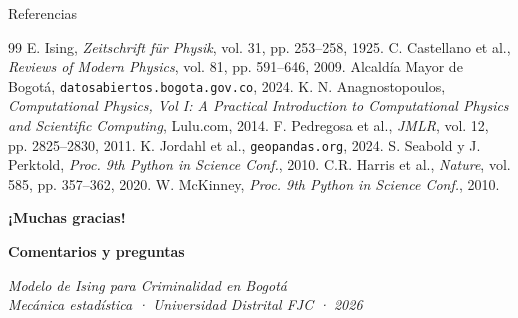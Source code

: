 \documentclass[11pt]{beamer}
\begin{document}
\begin{frame}{Referencias}

\footnotesize
\begin{thebibliography}{99}
 E. Ising, \textit{Zeitschrift für Physik}, vol. 31, pp. 253--258, 1925.
 C. Castellano et al., \textit{Reviews of Modern Physics}, vol. 81, pp. 591--646, 2009.
 Alcaldía Mayor de Bogotá, \texttt{datosabiertos.bogota.gov.co}, 2024.
K. N. Anagnostopoulos, \textit{Computational Physics, Vol I: A Practical Introduction to Computational Physics and Scientific Computing}, Lulu.com, 2014.
 F. Pedregosa et al., \textit{JMLR}, vol. 12, pp. 2825--2830, 2011.
 K. Jordahl et al., \texttt{geopandas.org}, 2024.
 S. Seabold y J. Perktold, \textit{Proc. 9th Python in Science Conf.}, 2010.
 C.R. Harris et al., \textit{Nature}, vol. 585, pp. 357--362, 2020.
 W. McKinney, \textit{Proc. 9th Python in Science Conf.}, 2010.
\end{thebibliography}
\end{frame}

\begin{frame}
\centering
\Huge \textbf{¡Muchas gracias!}
\vspace{1cm}

\large \textbf{Comentarios y preguntas}

\vspace{1cm}
\normalsize
\textit{Modelo de Ising para Criminalidad en Bogotá}\\
\textit{Mecánica estadística · Universidad Distrital FJC · 2026}
\end{frame}
\end{document}
